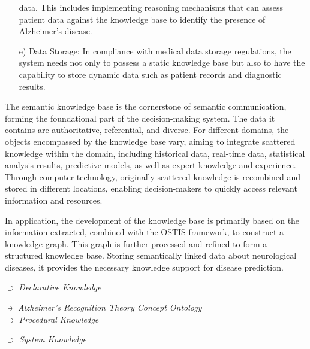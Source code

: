 \documentclass[10pt, a4paper]{article}
\begin{document}
\begin{SCn}
\begin{small}
\begin{multicols}{2}
\begin{flushright}
\begin{enumerate}
data. This includes implementing reasoning mechanisms that can assess patient data against the knowledge base to identify the presence of Alzheimer’s
disease.
\vspace{-0.2cm}
\item [e)] Data Storage: In compliance with medical data
storage regulations, the system needs not only to
possess a static knowledge base but also to have
the capability to store dynamic data such as patient
records and diagnostic results.
\vspace{-0.2cm}
\end{enumerate}
\end{flushright}
The semantic knowledge base is the cornerstone of
semantic communication, forming the foundational part
of the decision-making system. The data it contains
are authoritative, referential, and diverse. For different
domains, the objects encompassed by the knowledge base
vary, aiming to integrate scattered knowledge within the
domain, including historical data, real-time data, statistical analysis results, predictive models, as well as expert
knowledge and experience. Through computer technology, originally scattered knowledge is recombined and stored in different locations, enabling decision-makers to quickly access relevant information and resources.\par
 In application, the development of the knowledge base is primarily based on the information extracted, combined with the OSTIS framework, to construct a knowledge graph. This graph is further processed and refined to form a structured knowledge base. Storing semantically linked data about neurological diseases, it provides the necessary knowledge support for disease prediction.\par
\noindent
{}\par
\noindent
$\supset$ \hspace{0.3cm} \textit {Declarative Knowledge} \par
\textit { \hspace{0.6cm} $\ni$ \hspace{0.3cm} Alzheimer’s Recognition Theory Concept
Ontology\\
$\supset$ \hspace{0.3cm} Procedural Knowledge}\par
\textit { \hspace{0.6cm} $\supset$ \hspace{0.3cm} System Knowledge}\par
\vspace{-0.1cm}


\end{multicols}
\end{small}
\end{SCn}
\end{document}
